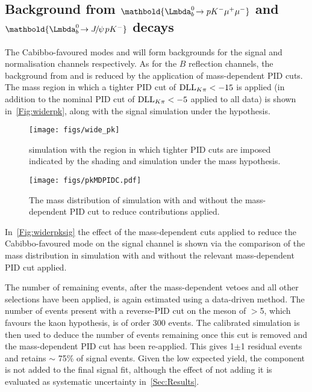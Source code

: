 




\FloatBarrier
\subsection[Background from $\LbK$ and $\LbKjpsi$ decays]{Background from $\mathbold{\LbK}$ and $\mathbold{\LbKjpsi}$ decays}\label{subsec:LbK}

The Cabibbo-favoured modes \LbK and \LbKjpsi will form backgrounds for the signal and normalisation channels respectively. As for the $B$ reflection channels, the background from \LbK and \LbKjpsi is reduced by the application of mass-dependent PID cuts. The mass region in which a tighter PID cut of $\mathrm{DLL}_{{K}{\pi}}<-15$ is applied (in addition to the nominal PID cut of $\mathrm{DLL}_{{K}{\pi}}<-5$ applied to all data) is shown in~\autoref{Fig:widerpk}, along with the signal simulation under the \LbK hypothesis. 

\begin{figure}[!h]\def\nh{0.3\textwidth}
  \centering
  \texttt{[image: figs/wide\_pk]}
  \caption{\LbK simulation with the region in which tighter PID cuts are imposed indicated by the shading and \Lbpi simulation under the \LbK mass hypothesis.}
  \label{Fig:widerpk}
\end{figure}
\begin{figure}[!h]\def\nh{0.3\textwidth}
  \centering
  \texttt{[image: figs/pkMDPIDC.pdf]}
  \caption{The mass distribution of \Lbpi simulation with and without the mass-dependent PID cut to reduce \LbK contributions applied.}
  \label{Fig:widerpksig}
\end{figure}
In~\autoref{Fig:widerpksig} the effect of the mass-dependent cuts applied to reduce the Cabibbo-favoured mode \LbK on the signal channel is shown via the comparison of the \Lbpi mass distribution in simulation with and without the relevant mass-dependent PID cut applied.

The number of remaining \LbK events, after the mass-dependent vetoes and all other selections have been applied, is again estimated using a data-driven method. The number of \LbK events present with a reverse-PID cut on the meson of \dllkpi$>$5, which favours the kaon hypothesis, is of order 300 events. The calibrated simulation is then used to deduce the number of \LbK events remaining once this cut is removed and the mass-dependent PID cut has been re-applied. This gives 1$\pm$1 residual \LbK events and retains $\sim$ 75\% of signal events. Given the low expected \LbK yield, the \LbK component is not added to the final signal fit, although the effect of not adding it is evaluated as systematic uncertainty in~\autoref{Sec:Results}.%

